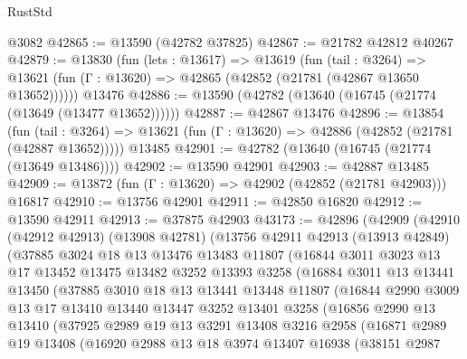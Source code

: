 \begin{lexlean}{RustStd}
\begin{coremodule}
    @3082
@42865 := @13590 (@42782 @37825)
@42867 := @21782 @42812 @40267
@42879 := @13830
    (fun (lets : @13617) =>
    @13619
      (fun (tail : @3264) =>
      @13621 (fun (Γ : @13620) => @42865 (@42852 (@21781 (@42867 @13650 @13652))))))
    @13476
@42886 := @13590 (@42782 (@13640 (@16745 (@21774 (@13649 (@13477 @13652))))))
@42887 := @42867 @13476
@42896 := @13854
    (fun (tail : @3264) => @13621 (fun (Γ : @13620) => @42886 (@42852 (@21781 (@42887 @13652)))))
    @13485
@42901 := @42782 (@13640 (@16745 (@21774 (@13649 @13486))))
@42902 := @13590 @42901
@42903 := @42887 @13485
@42909 := @13872 (fun (Γ : @13620) => @42902 (@42852 (@21781 @42903))) @16817
@42910 := @13756 @42901
@42911 := @42850 @16820
@42912 := @13590 @42911
@42913 := @37875 @42903
@43173 := @42896
    (@42909
      (@42910
        (@42912 @42913)
        (@13908 @42781)
        (@13756
          @42911
          @42913
          (@13913 @42849)
          (@37885
            @3024
            @18
            @13
            @13476
            @13483
            @11807
            (@16844
              @3011
              @3023
              @13
              @17
              @13452
              @13475
              @13482
              @3252
              @13393
              @3258
              (@16884
                @3011
                @13
                @13441
                @13450
                (@37885
                  @3010
                  @18
                  @13
                  @13441
                  @13448
                  @11807
                  (@16844
                    @2990
                    @3009
                    @13
                    @17
                    @13410
                    @13440
                    @13447
                    @3252
                    @13401
                    @3258
                    (@16856
                      @2990
                      @13
                      @13410
                      (@37925
                        @2989
                        @19
                        @13
                        @3291
                        @13408
                        @3216
                        @2958
                        (@16871
                          @2989
                          @19
                          @13408
                          (@16920
                            @2988
                            @13
                            @18
                            @3974
                            @13407
                            @16938
                            (@38151
                              @2987

\end{coremodule}
\end{lexlean}
